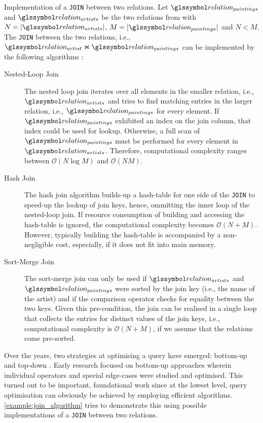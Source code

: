 \begin{example}[label=example:join_algorithm]{Implementation of a \texttt{JOIN} between two relations.}{}
    Let $\relation_{paintings}$ and $\relation_{artists}$ be the two relations from  with $N = |\relation_{artists}|$, $M = |\relation_{paintings}|$ and $N < M$. The \texttt{JOIN} between the two relations, i.e., $\relation_{artist} \Join \relation_{paintings}$ can be implemented by the following algorithms \cite{Graefe:1993Query}:

    \begin{description}
        \item[Nested-Loop Join] The nested loop join iterates over all elements in the smaller relation, i.e., $\relation_{artists}$ and tries to find matching entries in the larger relation, i.e., $\relation_{paintings}$ for every element. If $\relation_{paintings}$ exhibited an index on the join column, that index could be used for lookup. Otherwise, a full scan of $\relation_{paintings}$ must be performed for every element in $\relation_{artists}$. Therefore, computational complexity ranges between $\mathcal{O}(N \log M)$ and $\mathcal{O}(NM)$.
        \item[Hash Join] The hash join algorithm builds-up a hash-table for one side of the  \texttt{JOIN} to speed-up the lookup of join keys, hence, ommitting the inner loop of the nested-loop join. If resource consumption of building and accessing the hash-table is ignored, the computational complexity becomes $\mathcal{O}(N + M)$. However, typically building the hash-table is accompanied by a non-negligible cost, especially, if it does not fit into main memory.
        \item[Sort-Merge Join] The sort-merge join can only be used if $\relation_{artists}$ and $\relation_{paintings}$ were sorted by the join key (i.e., the name of the artist) and if the comparison operator checks for equality between the two keys. Given this pre-condition, the join can be realised in a single loop that collects the entries for distinct values of the join keys, i.e.,  computational complexity is  $\mathcal{O}(N + M)$, if we assume that the relations come pre-sorted.  
    \end{description}
\end{example}

Over the years, two strategies at optimising a query have emerged: bottom-up and top-down \cite{Jarke:1984Query}. Early research focused on bottom-up approaches wherein individual operators and special edge-cases were studied and optimised. This turned out to be important, foundational work since at the lowest level, query optimisation can obviously be achieved by employing efficient algorithms. \cref{example:join_algorithm} tries to demonstrate this using possible implementations of a \texttt{JOIN} between two relations.

